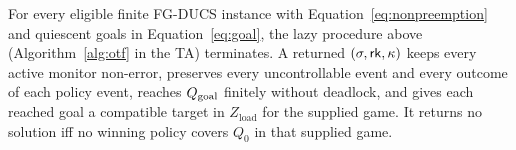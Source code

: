 \begin{theorem}
\label{thm:correctness}
\label{thm:termination}
\label{thm:soundness}
\label{thm:completeness}
For every eligible finite FG-DUCS instance with Equation~\eqref{eq:nonpreemption} and quiescent goals in Equation~\eqref{eq:goal}, the lazy procedure above (Algorithm~\ref{alg:otf} in the TA) terminates. A returned $(\sigma,\mathsf{rk},\kappa)$ keeps every active monitor non-error, preserves every uncontrollable event and every outcome of each policy event, reaches $Q_{\mathrm{goal}}$ finitely without deadlock, and gives each reached goal a compatible target in $Z_{\mathrm{load}}$ for the supplied game. It returns no solution iff no winning policy covers $Q_0$ in that supplied game.
\end{theorem}

